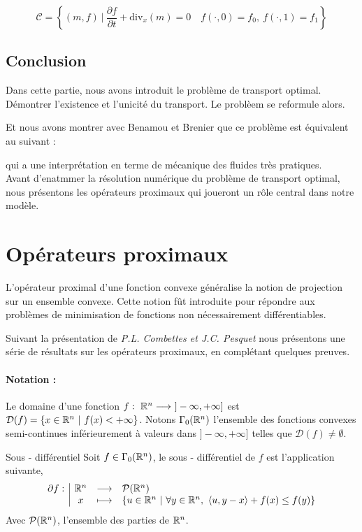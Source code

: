 \documentclass[a4paper,12pt]{article}
\renewcommand{\div}{\text{div}}
\begin{document}
\begin{equation}
\tag{C}
\mathcal{C}=\left\{(m,f)\ |\ \frac{\partial f}{\partial t} + \div_x(m)=0\quad f(\cdot,0)=f_0,\ f(\cdot,1)=f_1\right\}
\label{eq:constraint}
\end{equation}
\subsection{Conclusion}
Dans cette partie, nous avons introduit le problème de transport optimal. Démontrer l'existence et l'unicité du transport. 
Le problèem se reformule alors. 

Et nous avons montrer avec Benamou et Brenier que ce problème est équivalent au suivant : 

qui a une interprétation en terme de mécanique des fluides très pratiques. \\

Avant d'enatmmer la résolution numérique du problème de transport optimal, nous présentons les opérateurs proximaux qui joueront un rôle central dans notre modèle. 

\newpage
\section{Opérateurs proximaux}
\label{sec:prox}
L'opérateur proximal d'une fonction convexe généralise la notion de projection sur un ensemble convexe. Cette notion fût introduite pour répondre aux problèmes de minimisation de fonctions non nécessairement différentiables. 

Suivant la présentation de \emph{P.L. Combettes \emph{et} J.C. Pesquet} \cite{combettes} nous présentons une série de résultats sur les opérateurs proximaux, en complétant quelques preuves.
\paragraph{Notation :}Le domaine d'une fonction $f:\ \RR^n\longrightarrow\ ]-\infty,+\infty]$ est $\mathcal{D}(f) = \{ x\in\mathbb{R}^n\ |\ f(x) < +\infty \} $. Notons $\Gamma_0(\mathbb{R}^n)$ l'ensemble des fonctions convexes semi-continues inférieurement à valeurs dans $]-\infty,+\infty]$ telles que $\mathcal{D}(f) \neq \emptyset$. 

\begin{definition}{Sous - différentiel}
Soit $f\in\Gamma_0(\mathbb{R}^n)$, le sous - différentiel de $f$ est l'application suivante,
$$
\begin{array}[t]{l|ccl} \partial f: & \mathbb{R}^n & \longrightarrow & \mathcal{P}(\mathbb{R}^n) \\ & x & \longmapsto & \left\{ u\in\mathbb{R}^n\ |\ \forall y\in\mathbb{R}^n,\ \langle u,y-x\rangle +f(x)\leq f(y) \right\} \end{array}
$$ 
Avec $\mathcal{P}(\mathbb{R}^n)$, l'ensemble des parties de $\mathbb{R}^n$.
\end{definition}
\end{document}
